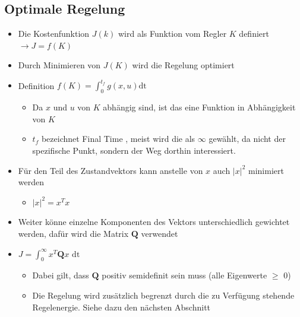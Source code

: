 \subsection{Optimale Regelung}
\begin{itemize}
	\item Die Kostenfunktion $J(k)$ wird als Funktion vom Regler $K$ definiert $\rightarrow J=f(K)$
	\item Durch Minimieren von $J(K)$ wird die Regelung optimiert
	\item Definition $f(K) = \int_{0}^{t_f}g(x,u) \text{dt}$ 
	\begin{itemize}
		\item  Da $x$ und $u$ von $K$ abhängig sind, ist das eine Funktion in Abhängigkeit von $K$
		\item $t_f$ bezeichnet \glqq Final Time \grqq, meist wird die als $\infty$ gewählt, da nicht der spezifische Punkt, sondern der \glqq Weg \grqq dorthin interessiert.
	\end{itemize}
	\item Für den Teil des Zustandvektors kann anstelle von $x$ auch $\vert x \vert^2$ minimiert werden
	\begin{itemize}
		\item $\vert x \vert ^2 = x^Tx$
	\end{itemize}
	\item Weiter könne einzelne Komponenten des Vektors unterschiedlich gewichtet werden, dafür wird die Matrix $\boldsymbol{Q}$ verwendet
	\item $J = \int_{0}^{\infty} x^T \boldsymbol{Q} x \text{ dt}$
	\begin{itemize}
		\item Dabei gilt, dass $\boldsymbol{Q}$ positiv semidefinit sein muss (alle Eigenwerte $\geq$ 0)
		\item Die Regelung wird zusätzlich begrenzt durch die zu Verfügung stehende Regelenergie. Siehe dazu den nächsten Abschnitt 
	\end{itemize}
\end{itemize}

